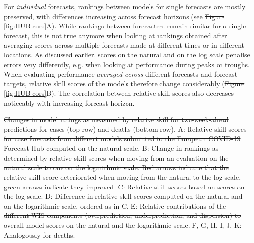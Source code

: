 \documentclass[10pt,letterpaper]{article} %
\providecommand{\DIFaddtex}[1]{{\protect\color{blue}\uwave{#1}}} %
\providecommand{\DIFdeltex}[1]{{\protect\color{red}\sout{#1}}}                      %
\providecommand{\DIFaddbegin}{} %
\providecommand{\DIFaddend}{} %
\providecommand{\DIFdelbegin}{} %
\providecommand{\DIFdelend}{} %
\providecommand{\DIFdelFL}[1]{\DIFdel{#1}} %
\providecommand{\DIFadd}[1]{\texorpdfstring{\DIFaddtex{#1}}{#1}} %
\providecommand{\DIFdel}[1]{\texorpdfstring{\DIFdeltex{#1}}{}} %
\newcommand{\DIFscaledelfig}{0.5}
\newlength{\DIFdelgraphicswidth} %
\newlength{\DIFdelgraphicsheight} %
\newcommand{\DIFaddincludegraphics}[2][]{{\color{blue}\fbox{\DIFOincludegraphics[#1]{#2}}}} %
\newcommand{\DIFdelincludegraphics}[2][]{%
\sbox{\DIFdelgraphicsbox}{\DIFOincludegraphics[#1]{#2}}%
\settoboxwidth{\DIFdelgraphicswidth}{\DIFdelgraphicsbox} %
\settoboxtotalheight{\DIFdelgraphicsheight}{\DIFdelgraphicsbox} %
\scalebox{\DIFscaledelfig}{%
\parbox[b]{\DIFdelgraphicswidth}{\usebox{\DIFdelgraphicsbox}\\[-\baselineskip] \rule{\DIFdelgraphicswidth}{0em}}\llap{\resizebox{\DIFdelgraphicswidth}{\DIFdelgraphicsheight}{%
\setlength{\unitlength}{\DIFdelgraphicswidth}%
\begin{picture}(1,1)%
\thicklines\linethickness{2pt} %
{\color[rgb]{1,0,0}\put(0,0){\framebox(1,1){}}}%
{\color[rgb]{1,0,0}\put(0,0){\line( 1,1){1}}}%
{\color[rgb]{1,0,0}\put(0,1){\line(1,-1){1}}}%
\end{picture}%
}\hspace*{3pt}}} %
} %
\DeclareRobustCommand{\DIFaddbegin}{\DIFOaddbegin \let\includegraphics\DIFaddincludegraphics} %
\DeclareRobustCommand{\DIFaddend}{\DIFOaddend \let\includegraphics\DIFOincludegraphics} %
\DeclareRobustCommand{\DIFdelbegin}{\DIFOdelbegin \let\includegraphics\DIFdelincludegraphics} %
\DeclareRobustCommand{\DIFdelend}{\DIFOaddend \let\includegraphics\DIFOincludegraphics} %
\begin{document}
For \textit{individual} forecasts, rankings between models for single forecasts are mostly preserved, with differences increasing across forecast horizons (see \DIFdelbegin \DIFdel{Figure }\DIFdelend \DIFaddbegin \DIFadd{Fig }\DIFaddend \ref{fig:HUB-cors}A). While rankings between forecasters remain similar for a single forecast, this is not true anymore when looking at rankings obtained after averaging scores across multiple forecasts made at different times or in different locations. As discussed earlier, scores on the natural and on the log scale penalise errors very differently, e.g. when looking at performance during peaks or troughs. When evaluating performance \textit{averaged across} different forecasts and forecast targets, relative skill scores of the models therefore change considerably (\DIFdelbegin \DIFdel{Figure }\DIFdelend \DIFaddbegin \DIFadd{Fig }\DIFaddend \ref{fig:HUB-cors}B). The correlation between relative skill scores also decreases noticeably with increasing forecast horizon. 

\DIFdelbegin %
{%
\DIFdelFL{Changes in model ratings as measured by relative skill for two-week-ahead predictions for cases (top row) and deaths (bottom row). A: Relative skill scores for case forecasts from different models submitted to the European COVID-19 Forecast Hub computed on the natural scale. B: Change in rankings as determined by relative skill scores when moving from an evaluation on the natural scale to one on the logarithmic scale. Red arrows indicate that the relative skill score deteriorated when moving from the natural to the log scale, green arrows indicate they improved. C: Relative skill scores based on scores on the log scale. D: Difference in relative skill scores computed on the natural and on the logarithmic scale, ordered as in C. E: Relative contributions of the different WIS components (overprediction, underprediction, and dispersion) to overall model scores on the natural and the logarithmic scale. F, G, H, I, J, K: Analogously for deaths.}}
\end{document}
